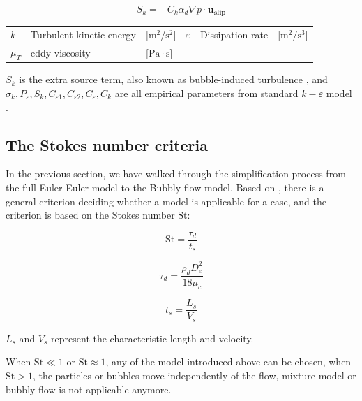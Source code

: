 \begin{equation}
    S_k = -C_k \alpha_d \nabla p \cdot \mathbf{u_{slip}}
\end{equation}

\begin{center}
\begin{tabular}{l l l| l l l}

  $k$  &  Turbulent kinetic energy & [$\mathrm{m^2/s^2}$] & $\varepsilon$ & Dissipation rate & [$\mathrm{m^2/s^3}$]\\
   
  $\mu_T$ & eddy viscosity & [$ \mathrm{Pa \cdot s}$]
   
\end{tabular}
\end{center}

$S_k$ is the extra source term, also known as bubble-induced turbulence \cite{Rzehak2013}, and $\sigma_k, P_{\varepsilon}, S_k, C_{\varepsilon 1}, C_{\varepsilon 2}, C_{\varepsilon}, C_k$ are all empirical parameters from standard $k-\varepsilon$ model \cite{COMSOL2016}.

\subsection{The Stokes number criteria}\label{stokessection}

In the previous section, we have walked through the simplification process from the full Euler-Euler model  to the Bubbly flow model. Based on \cite{ANSYSFLUENT13UsersGuide2013}, there is a general criterion deciding whether a model is applicable for a case, and the criterion is based on the Stokes number $\mathrm{St}$:

\begin{equation}
    \mathrm{St} = \frac{\tau_d}{t_s}
\end{equation}

\begin{equation}
    \tau_d = \frac{\rho_d D_e^2}{18 \mu_c}
\end{equation}

\begin{equation}
    t_s = \frac{L_s}{V_s}
\end{equation}

$L_s$ and $V_s$ represent the characteristic length and velocity. 

When $\mathrm{St} \ll 1$ or $\mathrm{St} \approx 1$, any of the model introduced above can be chosen, when $\mathrm{St} >1$, the particles or bubbles move independently of the flow, mixture model or bubbly flow is not applicable anymore.

